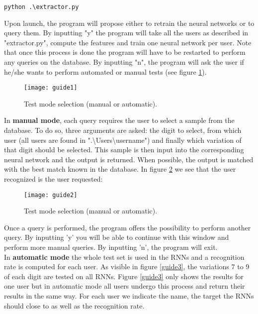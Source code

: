 \documentclass[a4paper]{article}
\begin{document}
{\vspace{2mm}
\begin{lstlisting}
python .\extractor.py
\end{lstlisting}
\vspace{2mm}

Upon launch, the program will propose either to retrain the neural networks or to query them. By inputting "y" the program will take all the users as described in "extractor.py", compute the features and train one neural network per user. Note that once this process is done the program will have to be restarted to perform any queries on the database. By inputting "n", the program will ask the user if he/she wants to perform automated or manual tests (see figure \ref{guide1}). 

\begin{figure}[h!]
  \centering
    \texttt{[image: guide1]}
  \caption{Test mode selection (manual or automatic).}
  \label{guide1}
\end{figure}

In \textbf{manual mode}, each query requires the user to select a sample from the database. To do so, three arguments are asked: the digit to select, from which user (all users are found in ".\textbackslash Users\textbackslash username") and finally which variation of that digit should be selected. This sample is then input into the corresponding neural network and the output is returned. When possible, the output is matched with the best match known in the database. In figure \ref{guide2} we see that the user recognized is the user requested:

\begin{figure}[h!]
  \centering
    \texttt{[image: guide2]}
  \caption{Test mode selection (manual or automatic).}
  \label{guide2}
\end{figure}

Once a query is performed, the program offers the possibility to perform another query. By inputting 'y' you will be able to continue with this window and perform more manual queries. By inputting 'n', the program will exit.\\

In \textbf{automatic mode} the whole test set is used in the RNNs and a recognition rate is computed for each user. As visible in figure \ref{guide3}, the variations 7 to 9 of each digit are tested on all RNNs. Figure \ref{guide3} only shows the results for one user but in automatic mode all users undergo this process and return their results in the same way. For each user we indicate the name, the target the RNNs should close to as well as the recognition rate.

}
\end{document}
